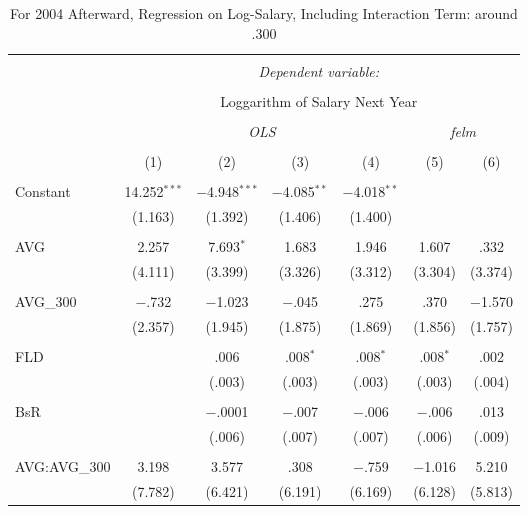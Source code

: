 
\begin{table}[H] \centering
  \caption{For 2004 Afterward, Regression on Log-Salary, Including Interaction Term: around .300}
  \label{AVG300_D}
\tiny
\begin{tabular}{@{\extracolsep{5pt}}lcccccc}
\\[-1.8ex]\hline
\hline \\[-1.8ex]
 & \multicolumn{6}{c}{\textit{Dependent variable:}} \\
\cline{2-7}
\\[-1.8ex] & \multicolumn{6}{c}{Loggarithm of Salary Next Year} \\
\\[-1.8ex] & \multicolumn{4}{c}{\textit{OLS}} & \multicolumn{2}{c}{\textit{felm}} \\
\\[-1.8ex] & (1) & (2) & (3) & (4) & (5) & (6)\\
\hline \\[-1.8ex]
 Constant & 14.252$^{***}$ & $-$4.948$^{***}$ & $-$4.085$^{**}$ & $-$4.018$^{**}$ &  &  \\
  & (1.163) & (1.392) & (1.406) & (1.400) &  &  \\
  & & & & & & \\
 AVG & 2.257 & 7.693$^{*}$ & 1.683 & 1.946 & 1.607 & .332 \\
  & (4.111) & (3.399) & (3.326) & (3.312) & (3.304) & (3.374) \\
  & & & & & & \\
 AVG\_300 & $-$.732 & $-$1.023 & $-$.045 & .275 & .370 & $-$1.570 \\
  & (2.357) & (1.945) & (1.875) & (1.869) & (1.856) & (1.757) \\
  & & & & & & \\
 FLD &  & .006 & .008$^{*}$ & .008$^{*}$ & .008$^{*}$ & .002 \\
  &  & (.003) & (.003) & (.003) & (.003) & (.004) \\
  & & & & & & \\
 BsR &  & $-$.0001 & $-$.007 & $-$.006 & $-$.006 & .013 \\
  &  & (.006) & (.007) & (.007) & (.006) & (.009) \\
  & & & & & & \\
 AVG:AVG\_300 & 3.198 & 3.577 & .308 & $-$.759 & $-$1.016 & 5.210 \\
  & (7.782) & (6.421) & (6.191) & (6.169) & (6.128) & (5.813) \\

\end{tabular}
\end{table}
